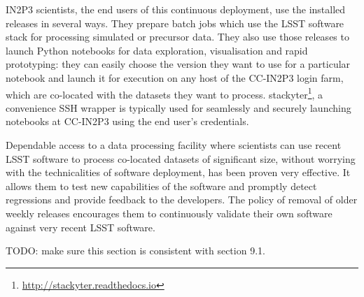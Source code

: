 IN2P3 scientists, the end users of this continuous deployment, use the installed releases in several ways. They prepare batch jobs which use the LSST software stack for processing simulated or precursor data. They also use those releases to launch Python notebooks for data exploration, visualisation and rapid prototyping: they can easily choose the version they want to use for a particular notebook and launch it for execution on any host of the CC-IN2P3 login farm, which are co-located with the datasets they want to process. stackyter\footnote{\url{http://stackyter.readthedocs.io}}, a convenience SSH wrapper is typically used for seamlessly and securely launching notebooks at CC-IN2P3 using the end user's credentials.

Dependable access to a data processing facility where scientists can use recent LSST software to process co-located datasets of significant size, without worrying with the technicalities of software deployment, has been proven very effective. It allows them to test new capabilities of the software and promptly detect regressions and provide feedback to the developers. The policy of removal of older weekly releases encourages them to continuously validate their own software against very recent LSST software.

TODO: make sure this section is consistent with section 9.1.

